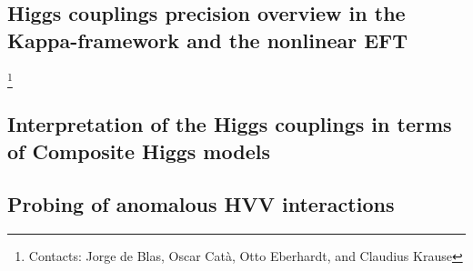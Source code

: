 \documentclass[../report.tex]{subfiles}
\providecommand{\main}{..}
\begin{document}
%
 
\subsection{Higgs couplings precision overview in the Kappa-framework and the nonlinear EFT}\label{sec2:theo_kappa_EFT}
\footnote{Contacts: Jorge de Blas, Oscar Cat\`a, Otto Eberhardt, and Claudius Krause} 


%

\subsection{Interpretation of the Higgs couplings in terms of Composite Higgs models}


\subsection[Probing of anomalous HVV interactions]{Probing of anomalous HVV interactions}
\label{sec2:anomalous_HVV}



\clearpage

\end{document}
